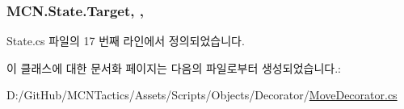 \subsubsection[{\texorpdfstring{Target}{Target}}]{ M\+C\+N.\+State.\+Target\hspace{0.3cm}{\ttfamily [get]}, {\ttfamily [protected]}, {\ttfamily [inherited]}}\hypertarget{class_m_c_n_1_1_state_a79a563b32f183c9adc9a96679fc57eb8}{}\label{class_m_c_n_1_1_state_a79a563b32f183c9adc9a96679fc57eb8}


State.\+cs 파일의 17 번째 라인에서 정의되었습니다.



이 클래스에 대한 문서화 페이지는 다음의 파일로부터 생성되었습니다.\+:\begin{DoxyCompactItemize}
\item 
D\+:/\+Git\+Hub/\+M\+C\+N\+Tactics/\+Assets/\+Scripts/\+Objects/\+Decorator/\hyperlink{_move_decorator_8cs}{Move\+Decorator.\+cs}\end{DoxyCompactItemize}
